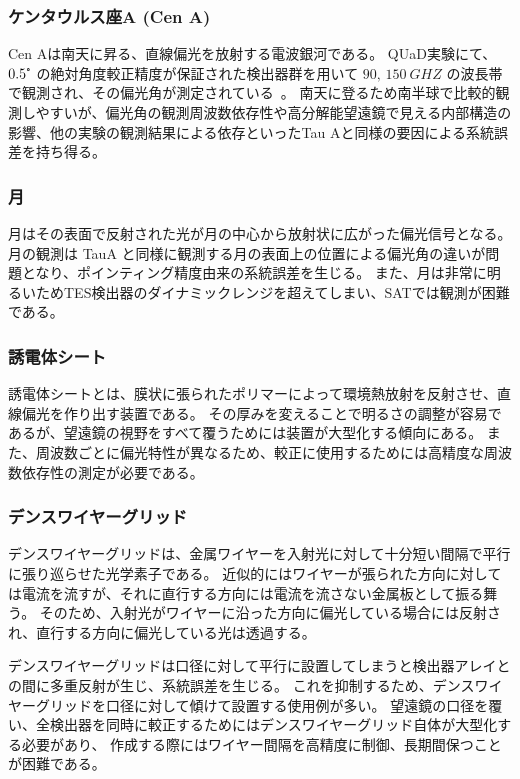 \documentclass[../../main.tex]{subfiles}
\begin{document}
\subsubsection{ケンタウルス座A (Cen A)}
Cen Aは南天に昇る、直線偏光を放射する電波銀河である。
QUaD実験にて、$0.5\tcdegree$ の絶対角度較正精度が保証された検出器群を用いて $90,\,\SI{150}{GHZ}$ の波長帯で観測され、その偏光角が測定されている~\cite{so:Zemcov_2010}。
南天に登るため南半球で比較的観測しやすいが、偏光角の観測周波数依存性や高分解能望遠鏡で見える内部構造の影響、他の実験の観測結果による依存といったTau Aと同様の要因による系統誤差を持ち得る。
\subsubsection{月}
月はその表面で反射された光が月の中心から放射状に広がった偏光信号となる。
月の観測は TauA と同様に観測する月の表面上の位置による偏光角の違いが問題となり、ポインティング精度由来の系統誤差を生じる。
また、月は非常に明るいためTES検出器のダイナミックレンジを超えてしまい、SATでは観測が困難である。
\subsubsection{誘電体シート}
誘電体シートとは、膜状に張られたポリマーによって環境熱放射を反射させ、直線偏光を作り出す装置である。
その厚みを変えることで明るさの調整が容易であるが、望遠鏡の視野をすべて覆うためには装置が大型化する傾向にある。
また、周波数ごとに偏光特性が異なるため、較正に使用するためには高精度な周波数依存性の測定が必要である。

\subsubsection{デンスワイヤーグリッド}
デンスワイヤーグリッドは、金属ワイヤーを入射光に対して十分短い間隔で平行に張り巡らせた光学素子である。
近似的にはワイヤーが張られた方向に対しては電流を流すが、それに直行する方向には電流を流さない金属板として振る舞う。
そのため、入射光がワイヤーに沿った方向に偏光している場合には反射され、直行する方向に偏光している光は透過する。

デンスワイヤーグリッドは口径に対して平行に設置してしまうと検出器アレイとの間に多重反射が生じ、系統誤差を生じる。
これを抑制するため、デンスワイヤーグリッドを口径に対して傾けて設置する使用例が多い。
望遠鏡の口径を覆い、全検出器を同時に較正するためにはデンスワイヤーグリッド自体が大型化する必要があり、
作成する際にはワイヤー間隔を高精度に制御、長期間保つことが困難である。
\end{document}
